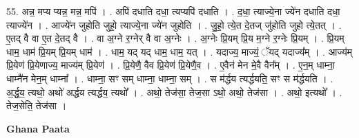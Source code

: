 \documentclass[17pt]{extarticle}
\begin{document}
55. अन्न॒ मप्य प्यन्न॒ मन्न॒ मपि॑ । . अपि॑ दधाति दधा॒ त्यप्यपि॑ दधाति । . द॒धा॒ त्याज्ये॒ना ज्ये॑न दधाति दधा॒ त्याज्ये॑न । . आज्ये॑न जुहोति जुहो॒ त्याज्ये॒ना ज्ये॑न जुहोति । . जु॒हो॒ त्ये॒त दे॒तज् जु॑होति जुहो त्ये॒तत् । . ए॒तद् वै वा ए॒त दे॒तद् वै । . वा अ॒ग्ने र॒ग्नेर् वै वा अ॒ग्नेः । . अ॒ग्नेः प्रि॒यम् प्रि॒य म॒ग्ने र॒ग्नेः प्रि॒यम् । . प्रि॒यम् धाम॒ धाम॑ प्रि॒यम् प्रि॒यम् धाम॑ । . धाम॒ यद् यद् धाम॒ धाम॒ यत् । . यदाज्य॒ माज्यं॒ ॅयद् यदाज्य᳚म् । . आज्य॑म् प्रि॒येण॑ प्रि॒येणाज्य॒ माज्य॑म् प्रि॒येण॑ । . प्रि॒येणै॒ वैव प्रि॒येण॑ प्रि॒येणै॒व । . ए॒वैन॑ मेन मे॒वै वैन᳚म् । . ए॒न॒म् धाम्ना॒ धाम्नै॑न मेन॒म् धाम्ना᳚ । . धाम्ना॒ सꣳ सम् धाम्ना॒ धाम्ना॒ सम् । . स म॑र्द्धय त्यर्द्धयति॒ सꣳ स म॑र्द्धयति । . अ॒र्द्ध॒य॒ त्यथो॒ अथो॑ अर्द्धय त्यर्द्धय॒ त्यथो᳚ । . अथो॒ तेज॑सा॒ तेज॒सा ऽथो॒ अथो॒ तेज॑सा । . अथो॒ इत्यथो᳚ । . तेज॒सेति॒ तेज॑सा । \newline

\textbf{Ghana Paata } \newline
\end{document}
